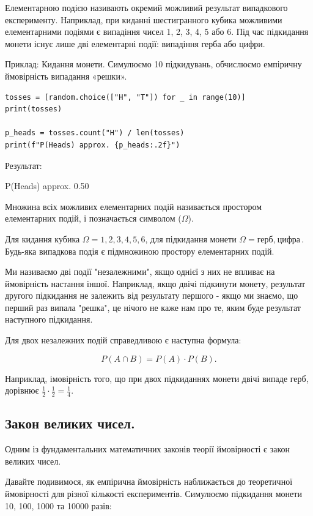 Елементарною подією називають окремий можливий результат випадкового експерименту. Наприклад, при киданні шестигранного кубика можливими елементарними подіями є випадіння чисел 1, 2, 3, 4, 5 або 6. Під час підкидання монети існує лише дві елементарні події: випадіння герба або цифри. 

Приклад: Кидання монети. Симулюємо 10 підкидувань, обчислюємо емпіричну ймовірність випадання «решки».

\begin{lstlisting}
tosses = [random.choice(["H", "T"]) for _ in range(10)]
print(tosses)

p_heads = tosses.count("H") / len(tosses)
print(f"P(Heads) approx. {p_heads:.2f}")
\end{lstlisting}

Результат:

\begin{console}
['H', 'T', 'T', 'H', 'H', 'H', 'H', 'T', 'T', 'T']
P(Heads) approx. 0.50
\end{console}

Множина всіх можливих елементарних подій називається простором елементарних подій, і позначається символом ($\Omega$).

Для кидання кубика $\Omega={1,2,3,4,5,6}$, для підкидання монети $\Omega={\text{герб},\ \text{цифра}}$. Будь-яка випадкова подія є підмножиною простору елементарних подій.

Ми називаємо дві події "незалежними", якщо однієї з них не впливає на ймовірність настання іншої. Наприклад, якщо двічі підкинути монету, результат другого підкидання не залежить від результату першого - якщо ми знаємо, що перший раз випала "решка", це нічого не каже нам про те, яким буде результат наступного підкидання. 

Для двох незалежних подій справедливою є наступна формула:

$$P(A\cap B)=P(A)\cdot P(B).$$

Наприклад, імовірність того, що при двох підкиданнях монети двічі випаде герб, дорівнює $\frac{1}{2}\cdot\frac{1}{2}=\frac{1}{4}$.



\subsection{Закон великих чисел.}

Одним із фундаментальних математичних законів теорії ймовірності є закон великих чисел.

Давайте подивимося, як емпірична ймовірність наближається до теоретичної ймовірності для різної кількості експериментів. Симулюємо підкидання монети 10, 100, 1000 та 10000 разів:

